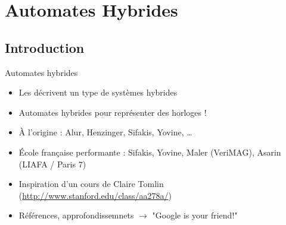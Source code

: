 \documentclass[compress]{beamer}
\begin{document}
\section{Automates Hybrides}
\begin{frame}
\tableofcontents[currentsection]
\end{frame}

\subsection{Introduction}
\begin{frame}{Automates hybrides}
\begin{itemize}
\item Les  décrivent un type de systèmes hybrides
\item Automates hybrides pour représenter des horloges  !
\item \`A l'origine : Alur, Henzinger, Sifakis, Yovine, \dots
\item \'Ecole française performante : Sifakis, Yovine, Maler (VeriMAG), Asarin (LIAFA / Paris 7)
\item Inspiration d'un cours de Claire Tomlin (\url{http://www.stanford.edu/class/aa278a/})
\item Références, approfondissemnets $\rightarrow$ "Google is your friend!"
\end{itemize}
\end{frame}
\end{document}

